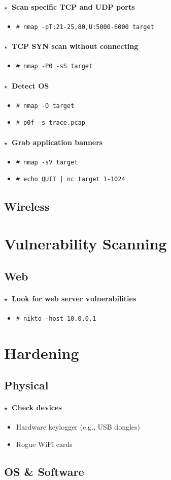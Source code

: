 \documentclass[10pt,landscape]{article}
\newcommand{\os}[1]{\texttt{\footnotesize{#1}}}
\newcommand{\unix}{\os{U}}
\newenvironment{action}[1]
  {\paragraph{$\star$~#1}\begin{itemize}[leftmargin=1cm]}
  {\end{itemize}}
\newcommand{\cmd}[2]{\item[#1] {\small\tt\# #2}}
\newcommand{\bulletpoint}[1]{\item {\small #1}}
\begin{document}
\begin{multicols*}{3}
\begin{action}{Scan specific TCP and UDP ports}
\cmd{\unix}{nmap -pT:21-25,80,U:5000-6000 target}
\end{action}

\begin{action}{TCP SYN scan without connecting}
\cmd{\unix}{nmap -P0 -sS target}
\end{action}

\begin{action}{Detect OS}
\cmd{\unix}{nmap -O target}
\cmd{\unix}{p0f -s trace.pcap}
\end{action}

\begin{action}{Grab application banners}
\cmd{\unix}{nmap -sV target}
\cmd{\unix}{echo QUIT | nc target 1-1024}
\end{action}

\subsection*{Wireless}

\section*{Vulnerability Scanning}

\subsection*{Web}
\begin{action}{Look for web server vulnerabilities}
\cmd{\unix}{nikto -host 10.0.0.1}
\end{action}

\section*{Hardening}

\subsection*{Physical}

\begin{action}{Check devices}
\bulletpoint{Hardware keylogger (e.g., USB dongles)}
\bulletpoint{Rogue WiFi cards}

\end{action}

\subsection*{OS \& Software}


\end{multicols*}
\end{document}
